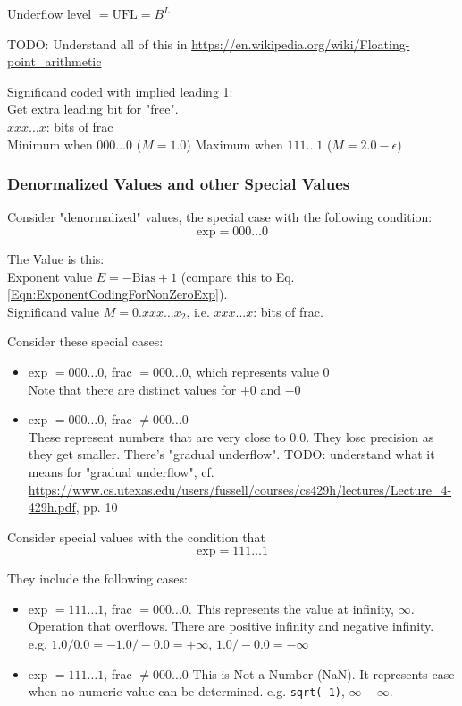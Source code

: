 \documentclass[10pt]{amsart}
\begin{document}
Underflow level $= \text{UFL} = B^L$

TODO: Understand all of this in \url{https://en.wikipedia.org/wiki/Floating-point_arithmetic}

Significand coded with implied leading 1: \\
Get extra leading bit for "free". \\
$xxx\dots x$: bits of frac \\
Minimum when $000 \dots 0$ ($M=1.0$)
Maximum when $111 \dots 1$ ($M = 2.0 - \epsilon$)

\subsubsection{Denormalized Values and other Special Values}

Consider "denormalized" values, the special case with the following condition:
\[
\text{exp} = 000\dots 0
\]

The Value is this: \\
Exponent value $E = -\text{Bias} + 1$ (compare this to Eq. \ref{Eqn:ExponentCodingForNonZeroExp}). \\
Significand value $M = 0.xxx\dots x_2$, i.e. $xxx...x$: bits of frac.

Consider these special cases:
\begin{itemize}
	\item exp $= 000\dots 0$, frac $ = 000\dots 0$, which represents value 0 \\
	Note that there are distinct values for $+0$ and $-0$
	\item exp $= 000 \dots 0$, frac $\neq 000\dots 0$ \\
	These represent numbers that are very close to 0.0. They lose precision as they get smaller. There's "gradual underflow". TODO: understand what it means for "gradual underflow", cf. \url{https://www.cs.utexas.edu/users/fussell/courses/cs429h/lectures/Lecture_4-429h.pdf}, pp. 10
\end{itemize}

Consider special values with the condition that 
\[
\text{exp} = 111\dots 1
\]

They include the following cases: 
\begin{itemize}
	\item exp $ = 111\dots 1$, frac $= 000 \dots 0$. This represents the value at infinity, $\infty$. Operation that overflows. There are positive infinity and negative infinity. \\
	e.g. $1.0/0.0 = -1.0/-0.0 = +\infty$, $1.0/-0.0 = -\infty$
	\item exp $ = 111\dots 1$, frac $\neq 000\dots 0$ This is Not-a-Number (NaN). It represents case when no numeric value can be determined. e.g. \verb|sqrt(-1)|, $\infty - \infty$.
\end{itemize}
\end{document}
